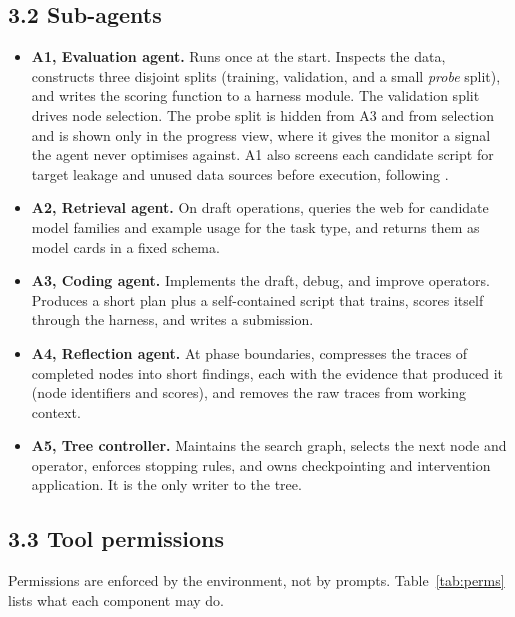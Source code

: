 \documentclass[11pt]{article}
\begin{document}
\subsection*{3.2 Sub-agents}

\begin{itemize}[leftmargin=*,itemsep=0.25em]
    \item \textbf{A1, Evaluation agent.} Runs once at the start. Inspects the data,
          constructs three disjoint splits (training, validation, and a small
          \emph{probe} split), and writes the scoring function to a harness module.
          The validation split drives node selection. The probe split is hidden from
          A3 and from selection and is shown only in the progress view, where it gives
          the monitor a signal the agent never optimises against. A1 also screens
          each candidate script for target leakage and unused data sources before
          execution, following \cite{mlestar}.
    \item \textbf{A2, Retrieval agent.} On draft operations, queries the web for
          candidate model families and example usage for the task type, and returns
          them as model cards in a fixed schema.
    \item \textbf{A3, Coding agent.} Implements the draft, debug, and improve
          operators. Produces a short plan plus a self-contained script that trains,
          scores itself through the harness, and writes a submission.
    \item \textbf{A4, Reflection agent.} At phase boundaries, compresses the traces
          of completed nodes into short findings, each with the evidence that
          produced it (node identifiers and scores), and removes the raw traces from
          working context.
    \item \textbf{A5, Tree controller.} Maintains the search graph, selects the next
          node and operator, enforces stopping rules, and owns checkpointing and
          intervention application. It is the only writer to the tree.
\end{itemize}

\subsection*{3.3 Tool permissions}

Permissions are enforced by the environment, not by prompts. Table~\ref{tab:perms}
lists what each component may do.
\end{document}
